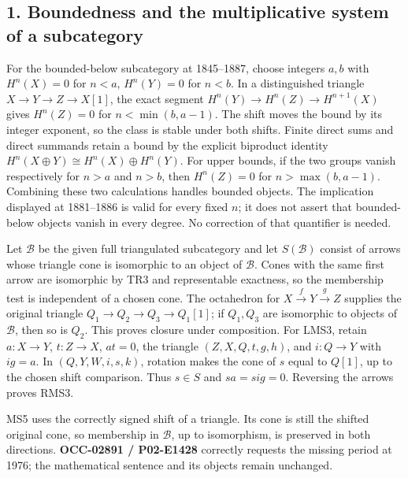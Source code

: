 \documentclass[11pt]{article}
\begin{document}
\subsection{1. Boundedness and the multiplicative system of a subcategory}\label{proofs-1844-2401-boundedness-and-the-multiplicative-system-of-a-subcategory}

For the bounded-below subcategory at 1845–\allowbreak{}1887,\allowbreak{} choose integers \(a,b\) with \(H^n(X)=0\) for \(n<a\),\allowbreak{} \(H^n(Y)=0\) for \(n<b\). In a distinguished triangle \(X\to Y\to Z\to X[1]\),\allowbreak{} the exact segment \(H^n(Y)\to H^n(Z)\to H^{n+1}(X)\) gives \(H^n(Z)=0\) for \(n<\min(b,a-1)\). The shift moves the bound by its integer exponent,\allowbreak{} so the class is stable under both shifts. Finite direct sums and direct summands retain a bound by the explicit biproduct identity \(H^n(X\oplus Y)\cong H^n(X)\oplus H^n(Y)\). For upper bounds,\allowbreak{} if the two groups vanish respectively for \(n>a\) and \(n>b\),\allowbreak{} then \(H^n(Z)=0\) for \(n>\max(b,a-1)\). Combining these two calculations handles bounded objects. The implication displayed at 1881–\allowbreak{}1886 is valid for every fixed \(n\); it does not assert that bounded-below objects vanish in every degree. No correction of that quantifier is needed.

Let \(\mathcal B\) be the given full triangulated subcategory and let \(S(\mathcal B)\) consist of arrows whose triangle cone is isomorphic to an object of \(\mathcal B\). Cones with the same first arrow are isomorphic by TR3 and representable exactness,\allowbreak{} so the membership test is independent of a chosen cone. The octahedron for \(X\xrightarrow fY\xrightarrow gZ\) supplies the original triangle \(Q_1\to Q_2\to Q_3\to Q_1[1]\); if \(Q_1,Q_3\) are isomorphic to objects of \(\mathcal B\),\allowbreak{} then so is \(Q_2\). This proves closure under composition. For LMS3,\allowbreak{} retain \(a:X\to Y\),\allowbreak{} \(t:Z\to X\),\allowbreak{} \(at=0\),\allowbreak{} the triangle \((Z,X,Q,t,g,h)\),\allowbreak{} and \(i:Q\to Y\) with \(ig=a\). In \((Q,Y,W,i,s,k)\),\allowbreak{} rotation makes the cone of \(s\) equal to \(Q[1]\),\allowbreak{} up to the chosen shift comparison. Thus \(s\in S\) and \(sa=sig=0\). Reversing the arrows proves RMS3.

MS5 uses the correctly signed shift of a triangle. Its cone is still the shifted original cone,\allowbreak{} so membership in \(\mathcal B\),\allowbreak{} up to isomorphism,\allowbreak{} is preserved in both directions. \textbf{OCC-02891 /\allowbreak{} P02-E1428} correctly requests the missing period at 1976; the mathematical sentence and its objects remain unchanged.
\end{document}
